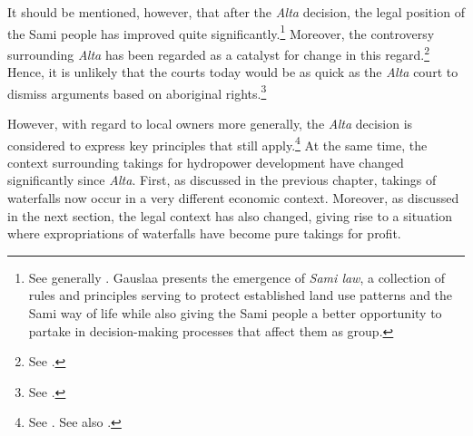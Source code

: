 It should be mentioned, however, that after the {\it Alta} decision, the legal position of the Sami people has improved quite significantly.\footnote{See generally \cite{gauslaa07}. Gauslaa presents the emergence of {\it Sami law}, a collection of rules and principles serving to protect established land use patterns and the Sami way of life while also giving the Sami people a better opportunity to partake in decision-making processes that affect them as group.} Moreover, the controversy surrounding {\it Alta} has been regarded as a catalyst for change in this regard.\footnote{See \cite[156]{ravna12s}.} Hence, it is unlikely that the courts today would be as quick as the {\it Alta} court to dismiss arguments based on aboriginal rights.\footnote{See \cite[180]{gauslaa07}.}

However, with regard to local owners more generally, the {\it Alta} decision is considered to express key principles that still apply.\footnote{See \cite{jorpeland11}. See also \cite[312]{haagensen02}.} %
At the same time, the context surrounding takings for hydropower development have changed significantly since {\it Alta}. First, as discussed in the previous chapter, takings of waterfalls now occur in a very different economic context. Moreover, as discussed in the next section, the legal context has also changed, giving rise to a situation where expropriations of waterfalls have become pure takings for profit.



